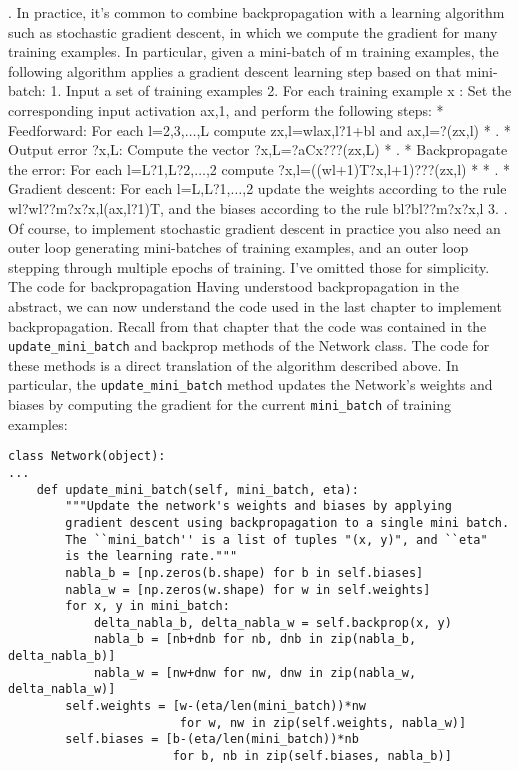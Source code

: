 . In practice, it's common to combine backpropagation with a learning algorithm such as stochastic gradient descent, in which we compute the gradient for many training examples. In particular, given a mini-batch of m
training examples, the following algorithm applies a gradient descent learning step based on that mini-batch: 
1. Input a set of training examples
2. For each training example x
: Set the corresponding input activation ax,1, and perform the following steps:
* Feedforward: For each l=2,3,$\ldots$,L
compute zx,l=wlax,l?1+bl and ax,l=?(zx,l)
*  .
*  Output error ?x,L: Compute the vector ?x,L=?aCx???(zx,L)
*  .
*  Backpropagate the error: For each l=L?1,L?2,$\ldots$,2 compute ?x,l=((wl+1)T?x,l+1)???(zx,l)
* *  . 
*  Gradient descent: For each l=L,L?1,$\ldots$,2 update the weights according to the rule wl?wl??m?x?x,l(ax,l?1)T, and the biases according to the rule bl?bl??m?x?x,l
3. .
Of course, to implement stochastic gradient descent in practice you also need an outer loop generating mini-batches of training examples, and an outer loop stepping through multiple epochs of training. I've omitted those for simplicity. 
The code for backpropagation
Having understood backpropagation in the abstract, we can now understand the code used in the last chapter to implement backpropagation. Recall from that chapter that the code was contained in the \lstinline{update_mini_batch} and backprop methods of the Network class. The code for these methods is a direct translation of the algorithm described above. In particular, the \lstinline{update_mini_batch} method updates the Network's weights and biases by computing the gradient for the current \lstinline{mini_batch} of training examples: 
\begin{lstlisting}
class Network(object):
...
    def update_mini_batch(self, mini_batch, eta):
        """Update the network's weights and biases by applying
        gradient descent using backpropagation to a single mini batch.
        The ``mini_batch'' is a list of tuples "(x, y)", and ``eta"
        is the learning rate."""
        nabla_b = [np.zeros(b.shape) for b in self.biases]
        nabla_w = [np.zeros(w.shape) for w in self.weights]
        for x, y in mini_batch:
            delta_nabla_b, delta_nabla_w = self.backprop(x, y)
            nabla_b = [nb+dnb for nb, dnb in zip(nabla_b, delta_nabla_b)]
            nabla_w = [nw+dnw for nw, dnw in zip(nabla_w, delta_nabla_w)]
        self.weights = [w-(eta/len(mini_batch))*nw 
                        for w, nw in zip(self.weights, nabla_w)]
        self.biases = [b-(eta/len(mini_batch))*nb 
                       for b, nb in zip(self.biases, nabla_b)]
\end{lstlisting}
